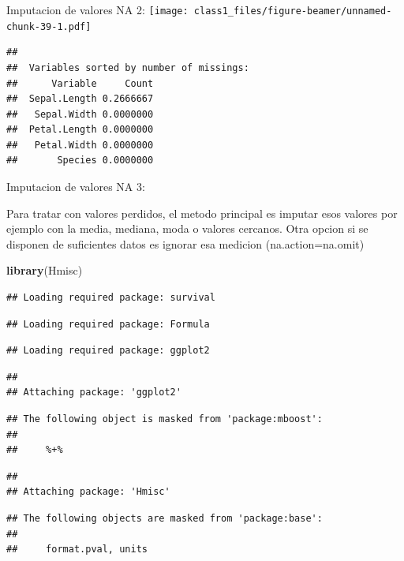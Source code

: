 \documentclass[ignorenonframetext,]{beamer}
\newenvironment{Shaded}{\begin{snugshade}}{\end{snugshade}}
\newcommand{\KeywordTok}[1]{\textcolor[rgb]{0.13,0.29,0.53}{\textbf{#1}}}
\newcommand{\NormalTok}[1]{#1}
\begin{document}
\begin{frame}[fragile]{Imputacion de valores NA 2:}
\texttt{[image: class1\_files/figure-beamer/unnamed-chunk-39-1.pdf]}

\begin{verbatim}
## 
##  Variables sorted by number of missings: 
##      Variable     Count
##  Sepal.Length 0.2666667
##   Sepal.Width 0.0000000
##  Petal.Length 0.0000000
##   Petal.Width 0.0000000
##       Species 0.0000000
\end{verbatim}

\end{frame}

\begin{frame}[fragile]{Imputacion de valores NA 3:}

Para tratar con valores perdidos, el metodo principal es imputar esos
valores por ejemplo con la media, mediana, moda o valores cercanos. Otra
opcion si se disponen de suficientes datos es ignorar esa medicion
(na.action=na.omit)

\begin{Shaded}
\begin{Highlighting}[]
\KeywordTok{library}\NormalTok{(Hmisc)}
\end{Highlighting}
\end{Shaded}

\begin{verbatim}
## Loading required package: survival
\end{verbatim}

\begin{verbatim}
## Loading required package: Formula
\end{verbatim}

\begin{verbatim}
## Loading required package: ggplot2
\end{verbatim}

\begin{verbatim}
## 
## Attaching package: 'ggplot2'
\end{verbatim}

\begin{verbatim}
## The following object is masked from 'package:mboost':
## 
##     %+%
\end{verbatim}

\begin{verbatim}
## 
## Attaching package: 'Hmisc'
\end{verbatim}

\begin{verbatim}
## The following objects are masked from 'package:base':
## 
##     format.pval, units
\end{verbatim}


\end{frame}
\end{document}
